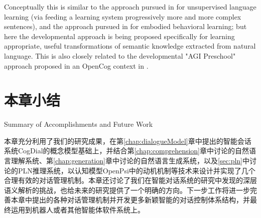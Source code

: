 Conceptually this is similar to the approach
pursued in \cite{Spitkovsky2013} for unsupervised language learning (via feeding a learning system progressively more and more complex
sentences), and the approach pursued in \cite{Goertzel2008w} for embodied behavioral learning; but here the developmental approach
is being proposed specifically for learning appropriate, useful transformations of semantic knowledge extracted from natural language.
This is also closely related to the developmental "AGI Preschool" approach proposed in an OpenCog context in \cite{Goertzel2009a}.



\section{本章小结}{Summary of Accomplishments and Future Work}

本章充分利用了我们的研究成果，在第\ref{chap:dialogueModel}章中提出的智能会话系统CogDial的概念模型基础上，并结合第\ref{chap:comprehension}章中讨论的自然语言理解系统、第\ref{chap:generation}章中讨论的自然语言生成系统，以及\ref{sec:pln}中讨论的PLN推理系统，以认知模型OpenPsi中的动机机制等技术来设计并实现了几个合理有效的对话管理机制。本章还讨论了我们在智能对话系统的研究中发现的深层语义解析的挑战，也给未来的研究提供了一个明确的方向。下一步工作将进一步完善本章中提出的各种对话管理机制并开发更多新颖智能的对话控制体系结构，并最终运用到机器人或者其他智能体软件系统上。


